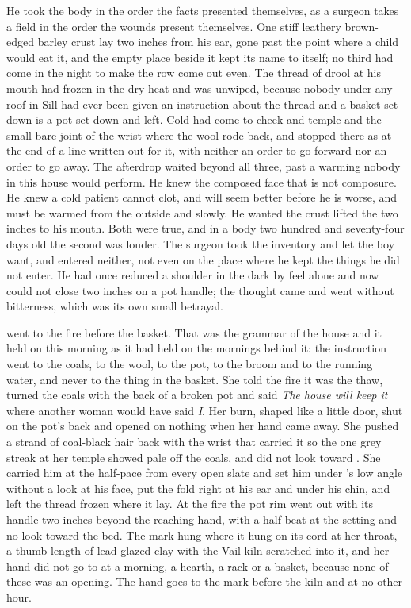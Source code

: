 He took the body in the order the facts presented themselves, as a surgeon takes a field in the order the wounds present themselves. One stiff leathery brown-edged barley crust lay two inches from his ear, gone past the point where a child would eat it, and the empty place beside it kept its name to itself; no third had come in the night to make the row come out even. The thread of drool at his mouth had frozen in the dry heat and was unwiped, because nobody under any roof in Sill had ever been given an instruction about the thread and a basket set down is a pot set down and left. Cold had come to cheek and temple and the small bare joint of the wrist where the wool rode back, and stopped there as at the end of a line written out for it, with neither an order to go forward nor an order to go away. The afterdrop waited beyond all three, past a warming nobody in this house would perform. He knew the composed face that is not composure. He knew a cold patient cannot clot, and will seem better before he is worse, and must be warmed from the outside and slowly. He wanted the crust lifted the two inches to his mouth. Both were true, and in a body two hundred and seventy-four days old the second was louder. The surgeon took the inventory and let the boy want, and entered neither, not even on the place where he kept the things he did not enter. He had once reduced a shoulder in the dark by feel alone and now could not close two inches on a pot handle; the thought came and went without bitterness, which was its own small betrayal.

 went to the fire before the basket. That was the grammar of the house and it held on this morning as it had held on the mornings behind it: the instruction went to the coals, to the wool, to the pot, to the broom and to the running water, and never to the thing in the basket. She told the fire it was the thaw, turned the coals with the back of a broken pot and said \emph{The house will keep it} where another woman would have said \emph{I}. Her burn, shaped like a little door, shut on the pot's back and opened on nothing when her hand came away. She pushed a strand of coal-black hair back with the wrist that carried it so the one grey streak at her temple showed pale off the coals, and did not look toward . She carried him at the half-pace from every open slate and set him under 's low angle without a look at his face, put the fold right at his ear and under his chin, and left the thread frozen where it lay. At the fire the pot rim went out with its handle two inches beyond the reaching hand, with a half-beat at the setting and no look toward the bed. The mark hung where it hung on its cord at her throat, a thumb-length of lead-glazed clay with the Vail kiln scratched into it, and her hand did not go to  at a morning, a hearth, a rack or a basket, because none of these was an opening. The hand goes to the mark before the kiln and at no other hour.

